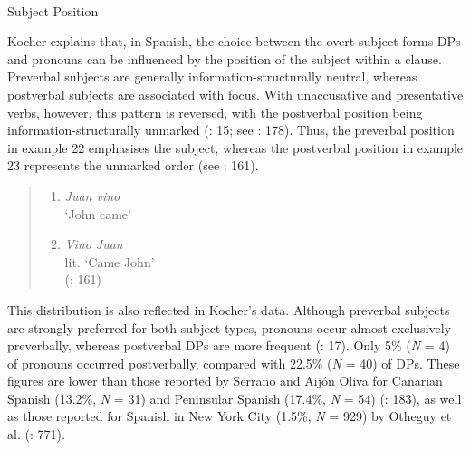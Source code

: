 \documentclass[
  letterpaper,
  DIV=11,
  numbers=noendperiod]{scrartcl}
\makeatletter
\let\oldparagraph\paragraph
\renewcommand{\paragraph}{
    \@ifstar
      \xxxParagraphStar
      \xxxParagraphNoStar
  }
\newcommand{\xxxParagraphStar}[1]{\oldparagraph*{#1}\mbox{}}
\newcommand{\xxxParagraphNoStar}[1]{\oldparagraph{#1}\mbox{}}
\providecommand{\tightlist}{%
  \setlength{\itemsep}{0pt}\setlength{\parskip}{0pt}}
\makeatother
\begin{document}
\paragraph{Subject Position}\label{subject-position}

Kocher explains that, in Spanish, the choice between the overt subject
forms DPs and pronouns can be influenced by the position of the subject
within a clause. Preverbal subjects are generally
information-structurally neutral, whereas postverbal subjects are
associated with focus. With unaccusative and presentative verbs,
however, this pattern is reversed, with the postverbal position being
information-structurally unmarked
(: 15; see
: 178). Thus, the preverbal
position in example 22 emphasises the subject, whereas the postverbal
position in example 23 represents the unmarked order (see
: 161).

\begin{quote}
\begin{enumerate}
\def\labelenumi{\arabic{enumi}.}
\setcounter{enumi}{21}
\tightlist
\item
  \emph{Juan vino}\\
  `John came'
\item
  \emph{Vino Juan}\\
  lit. `Came John'\\
  (: 161)
\end{enumerate}
\end{quote}

This distribution is also reflected in Kocher's data. Although preverbal
subjects are strongly preferred for both subject types, pronouns occur
almost exclusively preverbally, whereas postverbal DPs are more frequent
(: 17). Only 5\%
(\emph{N} = 4) of pronouns occurred postverbally, compared with 22.5\%
(\emph{N} = 40) of DPs. These figures are lower than those reported by
Serrano and Aijón Oliva for Canarian Spanish (13.2\%, \emph{N} = 31) and
Peninsular Spanish (17.4\%, \emph{N} = 54)
(: 183), as well as
those reported for Spanish in New York City (1.5\%, \emph{N} = 929) by
Otheguy et al. (: 771).
\end{document}
